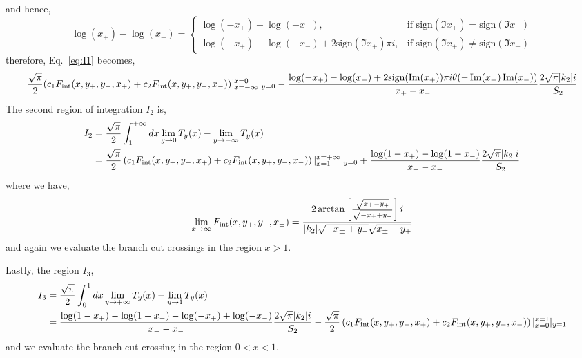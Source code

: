 \documentclass[twoside]{article}
\begin{document}
and hence,
\[
  \log(x_+) - \log(x_-) = 
  \begin{cases}
    \log(-x_+) - \log(-x_-), & \text{if } \textrm{sign}(\Im x_+) = \textrm{sign}(\Im x_-)\\
    \log(-x_+) - \log(-x_-) + 2\textrm{sign}(\Im x_+)\pi i, & \text{if } \textrm{sign}(\Im x_+) \neq \textrm{sign}(\Im x_-)
  \end{cases}
\]
therefore, Eq.~\eqref{eq:I1} becomes,
\begin{align}
  \frac{\sqrt{\pi}}{2}(c_1F_{\rm int}(x,y_+, y_-, x_+) + c_2F_{\rm int}(x, y_+, y_-, x_-))\vert^{x = 0}_{x = -\infty}\vert_{y = 0} -
  \frac{\log(-x_+) - \log(x_-) + 2\textrm{sign}(\Im(x_+))\pi i\theta(-\Im(x_+)\Im(x_-))}{x_+ - x_-}\frac{2\sqrt{\pi}|k_2|i}{S_2}
\end{align}
The second region of integration $I_2$ is,
\begin{align}
  I_2 &= \frac{\sqrt{\pi}}{2}\int^{+\infty}_{1}dx\lim_{y \rightarrow 0}T_{y}(x) - \lim_{y \rightarrow -\infty}T_y(x)\\
&= \frac{\sqrt{\pi}}{2}\left( c_1F_{\rm int}(x, y_+, y_-, x_+) + c_2F_{\rm int}(x, y_+, y_-, x_-) \right)\vert^{x =
+\infty}_{x = 1}\vert_{y = 0} + \frac{\log(1 - x_+) - \log(1 - x_-)}{x_+ - x_-}\frac{2\sqrt{\pi}|k_2|i}{S_2}
\end{align}
where we have,
\begin{align}
  \lim_{x \rightarrow \infty}F_{\rm int}(x, y_+, y_-, x_{\pm}) = \frac{2\arctan \left[ \frac{\sqrt{x_{\pm} - y_+}}{\sqrt{-x_{\pm} + y_-}}
  \right]i}{|k_2|\sqrt{-x_{\pm} + y_-}\sqrt{x_{\pm} - y_+}}
\end{align}
and again we evaluate the branch cut crossings in the region $x > 1$.

Lastly, the region $I_3$,
\begin{align}
  I_3 &= \frac{\sqrt{\pi}}{2}\int^{1}_0dx \lim_{y \rightarrow + \infty}T_y(x) - \lim_{y \rightarrow 1}T_y(x)\\
  &= \frac{\log(1 - x_+) - \log(1 - x_-) - \log(-x_+) + \log(-x_-)}{x_+ - x_-}\frac{2\sqrt{\pi}|k_2|i}{S_2} -
  \frac{\sqrt{\pi}}{2}\left( c_1F_{\rm int}(x, y_+, y_-, x_+) + c_2F_{\rm int}(x, y_+, y_-, x_-)
\right)\vert^{x = 1}_{x = 0}\vert_{y = 1}
\end{align}
and we evaluate the branch cut crossing in the region $0 < x < 1$.
\end{document}
